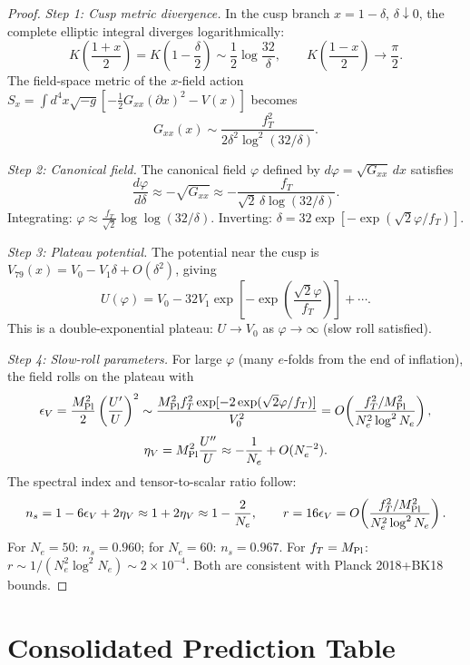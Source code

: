 \documentclass[12pt]{article}
\theoremstyle{plain}
\theoremstyle{definition}
\numberwithin{equation}{section}
\begin{document}
\begin{proof}
\emph{Step 1: Cusp metric divergence.}
In the cusp branch $x=1-\delta$, $\delta\downarrow0$, the complete elliptic integral diverges logarithmically:
\[
K\!\left(\frac{1+x}{2}\right)=K\!\left(1-\frac{\delta}{2}\right)\sim\frac{1}{2}\log\frac{32}{\delta},
\qquad K\!\left(\frac{1-x}{2}\right)\to\frac{\pi}{2}.
\]
The field-space metric of the $x$-field action $S_x=\int d^4x\sqrt{-g}\left[-\tfrac12 G_{xx}(\partial x)^2-V(x)\right]$ becomes
\[
G_{xx}(x)\sim\frac{f_T^2}{2\delta^2\log^2(32/\delta)}.
\]

\emph{Step 2: Canonical field.}
The canonical field $\varphi$ defined by $d\varphi=\sqrt{G_{xx}}\,dx$ satisfies
\[
\frac{d\varphi}{d\delta}\approx-\sqrt{G_{xx}}\approx-\frac{f_T}{\sqrt{2}\,\delta\log(32/\delta)}.
\]
Integrating: $\varphi\approx\frac{f_T}{\sqrt{2}}\log\log(32/\delta)$.
Inverting: $\delta=32\exp[-\exp(\sqrt{2}\varphi/f_T)]$.

\emph{Step 3: Plateau potential.}
The potential near the cusp is $V_{79}(x)=V_0-V_1\delta+O(\delta^2)$, giving
\[
U(\varphi)=V_0-32V_1\exp\!\left[-\exp\!\left(\frac{\sqrt{2}\varphi}{f_T}\right)\right]+\cdots.
\]
This is a double-exponential plateau: $U\to V_0$ as $\varphi\to\infty$ (slow roll satisfied).

\emph{Step 4: Slow-roll parameters.}
For large $\varphi$ (many $e$-folds from the end of inflation), the field rolls on the plateau with
\[
\epsilon_V=\frac{M_{\rm Pl}^2}{2}\left(\frac{U'}{U}\right)^2
\sim\frac{M_{\rm Pl}^2 f_T^2\exp[-2\exp(\sqrt{2}\varphi/f_T)]}{V_0^2}
=O\!\left(\frac{f_T^2/M_{\rm Pl}^2}{N_e^2\log^2 N_e}\right),
\]
\[
\eta_V=M_{\rm Pl}^2\frac{U''}{U}\approx-\frac{1}{N_e}+O(N_e^{-2}).
\]
The spectral index and tensor-to-scalar ratio follow:
\[
n_s=1-6\epsilon_V+2\eta_V\approx1+2\eta_V\approx1-\frac{2}{N_e},\qquad
r=16\epsilon_V=O\!\left(\frac{f_T^2/M_{\rm Pl}^2}{N_e^2\log^2N_e}\right).
\]
For $N_e=50$: $n_s=0.960$; for $N_e=60$: $n_s=0.967$.
For $f_T=M_{\rm Pl}$: $r\sim1/(N_e^2\log^2N_e)\sim2\times10^{-4}$.
Both are consistent with Planck 2018+BK18 bounds.
\end{proof}

\section{Consolidated Prediction Table}\label{sec:summary2}
\end{document}
